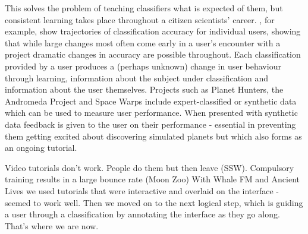 \documentclass{sigchi}
\begin{document}
This solves the problem of teaching classifiers what is expected of them, but consistent learning takes place throughout a citizen scientists' career. \cite{Smith}, for example, show trajectories of classification accuracy for individual users, showing that while large changes most often come early in a user's encounter with a project dramatic changes in accuracy are possible throughout. Each classification provided by a user produces a (perhaps unknown) change in user behaviour through learning, information about the subject under classification and information about the user themselves. Projects such as Planet Hunters, the Andromeda Project and Space Warps include expert-classified or synthetic data which can be used to measure user performance. When presented with synthetic data feedback is given to the user on their performance - essential in preventing them getting excited about discovering simulated planets but which also forms as an ongoing tutorial. 

Video tutorials don't work. People do them but then leave (SSW).
Compulsory training results in a large bounce rate (Moon Zoo)
With Whale FM and Ancient Lives we used tutorials that were interactive and overlaid on the interface - seemed to work well.
Then we moved on to the next logical step, which is guiding a user through a classification by annotating the interface as they go along. That's where we are now.




\end{document}
